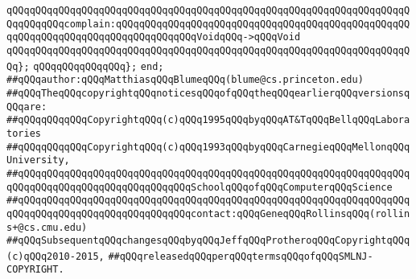\verb|qQQqqQQqqQQqqQQqqQQqqQQqqQQqqQQqqQQqqQQqqQQqqQQqqQQqqQQqqQQqqQQqqQQqqQQqqQQqqQQqcomplain:qQQqqQQqqQQqqQQqqQQqqQQqqQQqqQQqqQQqqQQqqQQqqQQqqQQqqQQqqQQqqQQqqQQqqQQqqQQqqQQqqQQqVoidqQQq->qQQqVoid|\newline
\verb|qQQqqQQqqQQqqQQqqQQqqQQqqQQqqQQqqQQqqQQqqQQqqQQqqQQqqQQqqQQqqQQqqQQqqQQq};|\newline
\verb|qQQqqQQqqQQqqQQq};|\newline
\verb|end;|\newline
\newline
\verb|##qQQqauthor:qQQqMatthiasqQQqBlumeqQQq(blume@cs.princeton.edu)|\newline
\verb|##qQQqTheqQQqcopyrightqQQqnoticesqQQqofqQQqtheqQQqearlierqQQqversionsqQQqare:|\newline
\verb|##qQQqqQQqqQQqCopyrightqQQq(c)qQQq1995qQQqbyqQQqAT&TqQQqBellqQQqLaboratories|\newline
\verb|##qQQqqQQqqQQqCopyrightqQQq(c)qQQq1993qQQqbyqQQqCarnegieqQQqMellonqQQqUniversity,|\newline
\verb|##qQQqqQQqqQQqqQQqqQQqqQQqqQQqqQQqqQQqqQQqqQQqqQQqqQQqqQQqqQQqqQQqqQQqqQQqqQQqqQQqqQQqqQQqqQQqqQQqqQQqSchoolqQQqofqQQqComputerqQQqScience|\newline
\verb|##qQQqqQQqqQQqqQQqqQQqqQQqqQQqqQQqqQQqqQQqqQQqqQQqqQQqqQQqqQQqqQQqqQQqqQQqqQQqqQQqqQQqqQQqqQQqqQQqqQQqcontact:qQQqGeneqQQqRollinsqQQq(rollins+@cs.cmu.edu)|\newline
\verb|##qQQqSubsequentqQQqchangesqQQqbyqQQqJeffqQQqProtheroqQQqCopyrightqQQq(c)qQQq2010-2015,|\newline
\verb|##qQQqreleasedqQQqperqQQqtermsqQQqofqQQqSMLNJ-COPYRIGHT.|\newline
\newline

